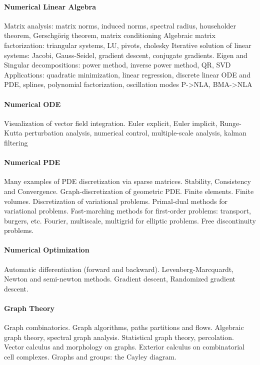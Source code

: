 \paragraph{Numerical Linear Algebra}
Matrix analysis: matrix norms, induced norms, spectral radius, householder
theorem, Gerschgörig theorem, matrix conditioning
Algebraic matrix factorization: triangular systems, LU, pivots, cholesky
Iterative solution of linear systems: Jacobi, Gauss-Seidel, gradient descent,
conjugate gradients.
Eigen and Singular decompositions: power method, inverse power method, QR,
SVD
Applications: quadratic minimization, linear regression, discrete linear ODE
and PDE, splines, polynomial factorization, oscillation modes
{P->NLA, BMA->NLA}

\paragraph{Numerical ODE}
Visualization of vector field integration.
Euler explicit, Euler implicit, Runge-Kutta
perturbation analysis, numerical control,
multiple-scale analysis, kalman filtering

\paragraph{Numerical PDE}
Many examples of PDE discretization via sparse matrices.
Stability, Consistency and Convergence.
Graph-discretization of geometric PDE.
Finite elements.
Finite volumes.
Discretization of variational problems.
Primal-dual methods for variational problems.
Fast-marching methods for first-order problems: transport, burgers, etc.
Fourier, multiscale, multigrid for elliptic problems.
Free discontinuity problems.

\paragraph{Numerical Optimization}
Automatic differentiation (forward and backward).
Levenberg-Marcquardt, Newton and semi-newton methods.
Gradient descent, Randomized gradient descent.

\paragraph{Graph Theory}
Graph combinatorics.
Graph algorithms, paths partitions and flows.
Algebraic graph theory, spectral graph analysis.
Statistical graph theory, percolation.
Vector calculus and morphology on graphs.
Exterior calculus on combinatorial cell complexes.
Graphs and groups: the Cayley diagram.

